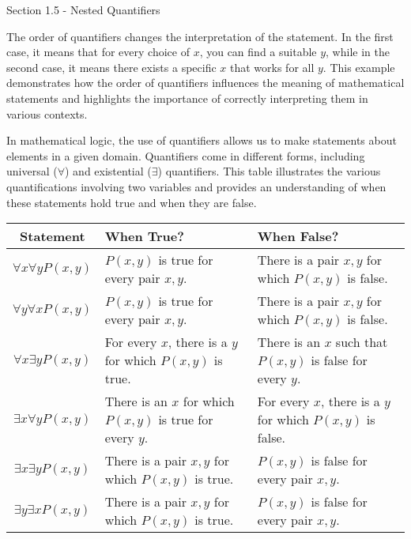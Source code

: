 \begin{notes}{Section 1.5 - Nested Quantifiers}
\begin{Highlight}
        The order of quantifiers changes the interpretation of the statement. In the first case, it means that for every choice of \(x\), you can find a suitable \(y\), while in the second case, it means there exists a specific \(x\) that works for all \(y\). 
        This example demonstrates how the order of quantifiers influences the meaning of mathematical statements and highlights the importance of correctly interpreting them in various contexts.
    \end{Highlight}
    
    In mathematical logic, the use of quantifiers allows us to make statements about elements in a given domain. Quantifiers come in different forms, including universal (\(\forall\)) and existential (\(\exists\)) quantifiers. This table illustrates the various 
    quantifications involving two variables and provides an understanding of when these statements hold true and when they are false.

    \begin{center}
        \begin{tabular}{|c|p{6cm}|p{6cm}|}
            \hline \textbf{Statement} & \textbf{When True?} & \textbf{When False?} \\ \hline
            \(\forall x \forall y P(x, y)\) & \(P(x, y)\) is true for every pair \(x, y\). & There is a pair \(x, y\) for which \(P(x, y)\) is false. \\ \hline
            \(\forall y \forall x P(x, y)\) & \(P(x, y)\) is true for every pair \(x, y\). & There is a pair \(x, y\) for which \(P(x, y)\) is false. \\ \hline
            \(\forall x \exists y P(x, y)\) & For every \(x\), there is a \(y\) for which \(P(x, y)\) is true. & There is an \(x\) such that \(P(x, y)\) is false for every \(y\). \\ \hline
            \(\exists x \forall y P(x, y)\) & There is an \(x\) for which \(P(x, y)\) is true for every \(y\). & For every \(x\), there is a \(y\) for which \(P(x, y)\) is false. \\ \hline
            \(\exists x \exists y P(x, y)\) & There is a pair \(x, y\) for which \(P(x, y)\) is true. & \(P(x, y)\) is false for every pair \(x, y\). \\ \hline
            \(\exists y \exists x P(x, y)\) & There is a pair \(x, y\) for which \(P(x, y)\) is true. & \(P(x, y)\) is false for every pair \(x, y\). \\ \hline
        \end{tabular}
    \end{center}
    

\end{notes}
